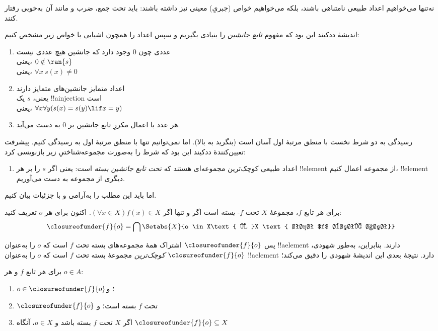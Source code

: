 \documentclass[../../../include/open-logic-section]{subfiles}
\begin{document}

نه‌تنها می‌خواهیم اعداد طبیعی نامتناهی باشند، بلکه می‌خواهیم خواص
(جبریِ) معینی نیز داشته باشند: باید تحت جمع، ضرب و مانند آن به‌خوبی رفتار
کنند.

اندیشهٔ ددکیند این بود که مفهوم \emph{تابع جانشین} را بنیادی بگیریم و
سپس اعداد را همچون اشیایی با خواص زیر مشخص کنیم:
\begin{enumerate}
	\item عددی چون $0$ وجود دارد که جانشین هیچ عددی نیست
	\\یعنی، $0 \notin \ran{s}$
	\\یعنی، $\forall x\ s(x) \neq 0$
	\item اعداد متمایز جانشین‌های متمایز دارند
	\\یعنی، $s$ یک !!a{injection} است
	\\یعنی، $\forall x \forall y (s(x) = s(y) \lif x = y)$
	\item{} هر عدد با اعمال مکررِ تابع جانشین
	بر $0$ به دست می‌آید.
\end{enumerate}
رسیدگی به دو شرط نخست با منطق مرتبهٔ اول آسان است (بنگرید به بالا). اما
نمی‌توانیم تنها با منطق مرتبهٔ اول به  رسیدگی
کنیم. پیشرفت تعیین‌کنندهٔ ددکیند این بود که شرط
 را به‌صورت مجموعه‌شناختیِ زیر بازنویسی کرد:
\begin{enumerate}
	\item[3$'$.] اعداد طبیعی کوچک‌ترین مجموعه‌ای هستند که
	\emph{تحت تابع جانشین بسته} است: یعنی اگر $s$ را بر هر !!{element}
	از مجموعه اعمال کنیم، !!{element} دیگری از مجموعه به دست می‌آوریم.
\end{enumerate}
اما باید این مطلب را به‌آرامی و با جزئیات بیان کنیم.

\begin{defn}
	برای هر تابع $f$، مجموعهٔ $X$ تحت $f$-
	\emph{بسته} است {اگر و تنها اگر} $(\forall x \in X)f(x) \in X$. اکنون
	برای هر $o$ تعریف کنید:
	$$\closureofunder{f}{o} = \bigcap\Setabs{X}{o \in X\text{ و }X
\text{ تحت $f$ بسته است}}$$
\end{defn}

پس $\closureofunder{f}{o}$ اشتراک همهٔ مجموعه‌های بسته تحت $f$ است که
$o$ را به‌عنوان !!a{element} دارند. بنابراین، به‌طور شهودی،
$\closureofunder{f}{o}$ \emph{کوچک‌ترین} مجموعهٔ بسته تحت $f$ است که
$o$ را به‌عنوان !!a{element} دارد. نتیجهٔ بعدی این اندیشهٔ شهودی را
دقیق می‌کند؛
\begin{lem}
	برای هر تابع $f$ و هر $o \in A$:
	\begin{enumerate}
		\item{} $o \in \closureofunder{f}{o}$؛ و
		\item{} $\closureofunder{f}{o}$ تحت $f$ بسته است؛ و
		\item{} اگر $X$ تحت $f$ بسته باشد و $o \in
		X$، آنگاه $\closureofunder{f}{o} \subseteq X$
	\end{enumerate}
\end{lem}
\end{document}

